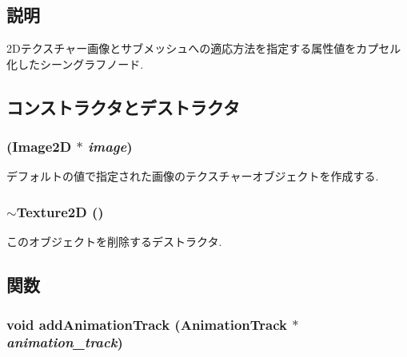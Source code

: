 \subsection{説明}
2Dテクスチャー画像とサブメッシュへの適応方法を指定する属性値をカプセル化したシーングラフノード. 

\subsection{コンストラクタとデストラクタ}
\hypertarget{classm3g_1_1Texture2D_7a8d6431e41022e29ac936afc5e97b8e}{
\subsubsection[{Texture2D}]{ ({\bf Image2D} $\ast$ {\em image})}}
\label{classm3g_1_1Texture2D_7a8d6431e41022e29ac936afc5e97b8e}


デフォルトの値で指定された画像のテクスチャーオブジェクトを作成する. \hypertarget{classm3g_1_1Texture2D_060332aea614a81a914cd2e55f1794df}{
\subsubsection[{$\sim$Texture2D}]{\setlength{\rightskip}{0pt plus 5cm}$\sim${\bf Texture2D} ()}}
\label{classm3g_1_1Texture2D_060332aea614a81a914cd2e55f1794df}


このオブジェクトを削除するデストラクタ. 

\subsection{関数}
\hypertarget{classm3g_1_1Texture2D_415c0b110f95410ded9b85e5d99a496b}{
\subsubsection[{addAnimationTrack}]{\setlength{\rightskip}{0pt plus 5cm}void addAnimationTrack ({\bf AnimationTrack} $\ast$ {\em animation\_\-track})}}
\label{classm3g_1_1Texture2D_415c0b110f95410ded9b85e5d99a496b}


